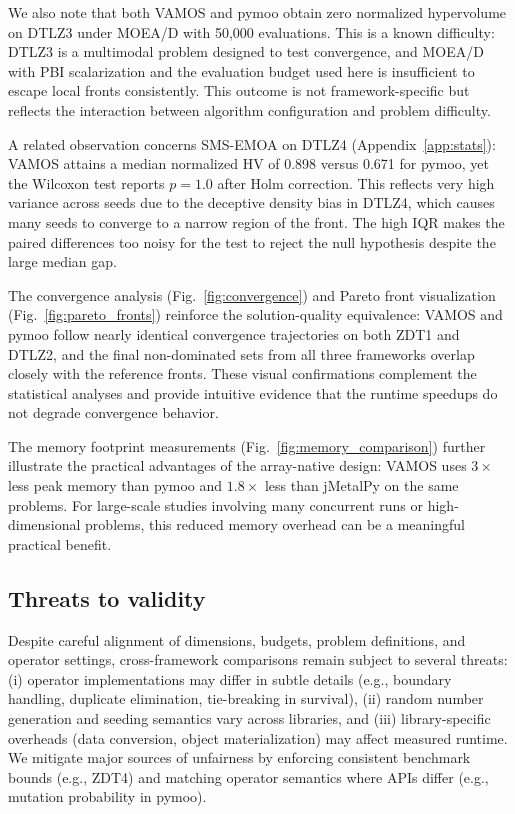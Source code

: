 \documentclass[journal]{IEEEtran}
\newcommand{\VAMOS}{VAMOS}
\begin{document}
We also note that both \VAMOS{} and pymoo obtain zero normalized hypervolume on DTLZ3 under MOEA/D with 50{,}000 evaluations. This is a known difficulty: DTLZ3 is a multimodal problem designed to test convergence, and MOEA/D with PBI scalarization and the evaluation budget used here is insufficient to escape local fronts consistently. This outcome is not framework-specific but reflects the interaction between algorithm configuration and problem difficulty.

A related observation concerns SMS-EMOA on DTLZ4 (Appendix~\ref{app:stats}): \VAMOS{} attains a median normalized HV of 0.898 versus 0.671 for pymoo, yet the Wilcoxon test reports $p=1.0$ after Holm correction. This reflects very high variance across seeds due to the deceptive density bias in DTLZ4, which causes many seeds to converge to a narrow region of the front. The high IQR makes the paired differences too noisy for the test to reject the null hypothesis despite the large median gap.

The convergence analysis (Fig.~\ref{fig:convergence}) and Pareto front visualization (Fig.~\ref{fig:pareto_fronts}) reinforce the solution-quality equivalence: \VAMOS{} and pymoo follow nearly identical convergence trajectories on both ZDT1 and DTLZ2, and the final non-dominated sets from all three frameworks overlap closely with the reference fronts. These visual confirmations complement the statistical analyses and provide intuitive evidence that the runtime speedups do not degrade convergence behavior.

The memory footprint measurements (Fig.~\ref{fig:memory_comparison}) further illustrate the practical advantages of the array-native design: \VAMOS{} uses $3\times$ less peak memory than pymoo and $1.8\times$ less than jMetalPy on the same problems. For large-scale studies involving many concurrent runs or high-dimensional problems, this reduced memory overhead can be a meaningful practical benefit.

\subsection{Threats to validity}

Despite careful alignment of dimensions, budgets, problem definitions, and operator settings, cross-framework comparisons remain subject to several threats: (i) operator implementations may differ in subtle details (e.g., boundary handling, duplicate elimination, tie-breaking in survival), (ii) random number generation and seeding semantics vary across libraries, and (iii) library-specific overheads (data conversion, object materialization) may affect measured runtime. We mitigate major sources of unfairness by enforcing consistent benchmark bounds (e.g., ZDT4) and matching operator semantics where APIs differ (e.g., mutation probability in pymoo).
\end{document}
